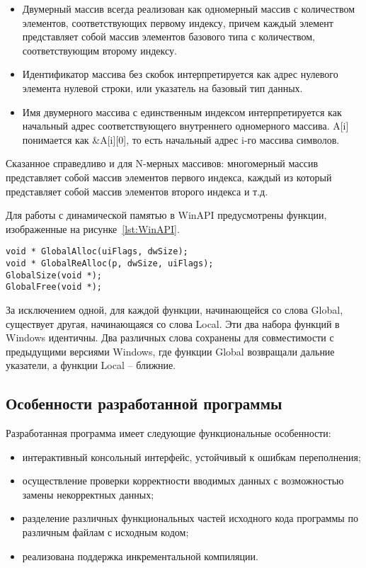 \begin{itemize}
\item Двумерный массив всегда реализован как одномерный массив с количеством
  элементов, соответствующих первому индексу, причем каждый элемент
  представляет собой массив элементов базового типа с количеством,
  соответствующим второму индексу.
\item Идентификатор массива без скобок интерпретируется как адрес нулевого
  элемента нулевой строки, или указатель на базовый тип данных.
\item Имя двумерного массива с единственным
  индексом интерпретируется как начальный адрес соответствующего
  внутреннего одномерного массива. A[i] понимается как \&A[i][0], то есть
  начальный адрес i-го массива символов.
\end{itemize}

Сказанное справедливо и для N-мерных массивов: многомерный массив представляет собой массив элементов первого индекса, каждый из который представляет собой массив элементов второго индекса и т.д.

Для работы с динамической памятью в WinAPI предусмотрены функции,
изображенные на рисунке~\ref{lst:WinAPI}.

\begin{lstlisting}[caption=Функции WinAPI для работы с памятью,label=lst:WinAPI]
void * GlobalAlloc(uiFlags, dwSize);
void * GlobalReAlloc(p, dwSize, uiFlags);
GlobalSize(void *);
GlobalFree(void *);
\end{lstlisting}

За исключением одной, для каждой функции, начинающейся со слова Global, существует другая, начинающаяся со слова Local. Эти два набора функций в Windows идентичны. Два различных слова сохранены для совместимости с предыдущими версиями Windows, где функции Global возвращали дальние указатели, а функции Local – ближние.

\pagebreak

\subsection{Особенности разработанной программы}

Разработанная 
программа имеет следующие функциональные особенности:

\begin{itemize}
\item интерактивный консольный интерфейс, устойчивый к ошибкам переполнения;
\item осуществление проверки корректности вводимых данных с возможностью 
  замены некорректных данных;
\item разделение различных функциональных частей исходного кода программы 
  по различным файлам с исходным кодом;
\item реализована поддержка инкрементальной компиляции.
\end{itemize}

